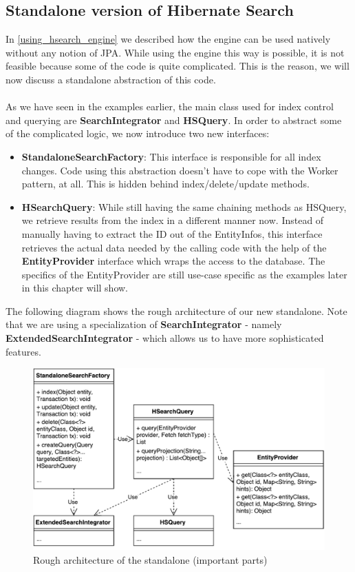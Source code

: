 \pagebreak

\subsection{Standalone version of Hibernate Search} \label{standalone_hibernate_search}

In \ref{using_hsearch_engine} we described how the engine can be used natively without any notion of JPA. While using the engine this way is possible, it is not feasible because some of the code is quite complicated. This is the reason, we will now discuss a standalone abstraction of this code.
\\\\
As we have seen in the examples earlier, the main class used for index control and querying are \textbf{SearchIntegrator} and \textbf{HSQuery}. In order to abstract some of the complicated logic, we now introduce two new interfaces: 

\begin{itemize}
	\item \textbf{StandaloneSearchFactory}: This interface is responsible for all index changes. Code using this abstraction doesn't have to cope with the Worker pattern, at all. This is hidden behind index/delete/update methods.
	
	\item \textbf{HSearchQuery}: While still having the same chaining methods as HSQuery, we retrieve results from the index in a different manner now. Instead of manually having to extract the ID out of the EntityInfos, this interface retrieves the actual data needed by the calling code with the help of the \textbf{EntityProvider} interface which wraps the access to the database. The specifics of the EntityProvider are still use-case specific as the examples later in this chapter will show.
\end{itemize}
\noindent
The following diagram shows the rough architecture of our new standalone. Note that we are using a specialization of \textbf{SearchIntegrator} - namely \textbf{ExtendedSearchIntegrator} - which allows us to have more sophisticated features.

\begin{figure}[ht]
	\centering
	\includegraphics[scale=0.6]{images/standalone_min_architecture.pdf}
	\caption{Rough architecture of the standalone (important parts)}
	\label{standalone_min_architecture}
\end{figure}

